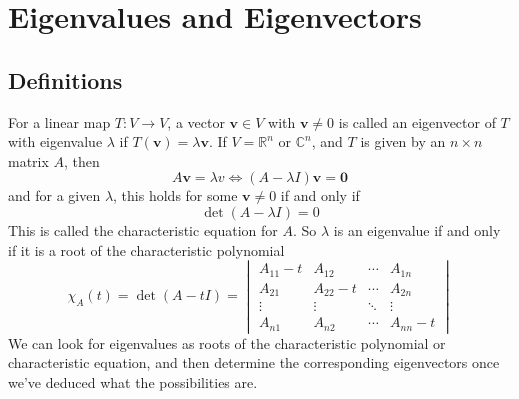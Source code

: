 \documentclass{article}
\begin{document}
	\section{Eigenvalues and Eigenvectors}
	\subsection{Definitions}
	For a linear map $T\colon V \to V$, a vector $\bm v \in V$ with $\bm v \neq 0$ is called an eigenvector of $T$ with eigenvalue $\lambda$ if $T(\bm v) = \lambda \bm v$. If $V = \mathbb R^n$ or $\mathbb C^n$, and $T$ is given by an $n \times n$ matrix $A$, then
	\[ A\bm v = \lambda v \iff (A - \lambda I)\bm v = \bm 0 \]
	and for a given $\lambda$, this holds for some $\bm v \neq 0$ if and only if
	\[ \det(A - \lambda I) = 0 \]
	This is called the characteristic equation for $A$. So $\lambda$ is an eigenvalue if and only if it is a root of the characteristic polynomial
	\[ \chi_A(t) = \det(A - tI) = \begin{vmatrix}
		A_{11} - t & A_{12} & \cdots & A_{1n} \\
		A_{21} & A_{22} - t & \cdots & A_{2n} \\
		\vdots & \vdots & \ddots & \vdots \\
		A_{n1} & A_{n2} & \cdots & A_{nn} - t
	\end{vmatrix} \]
	We can look for eigenvalues as roots of the characteristic polynomial or characteristic equation, and then determine the corresponding eigenvectors once we've deduced what the possibilities are.
\end{document}
